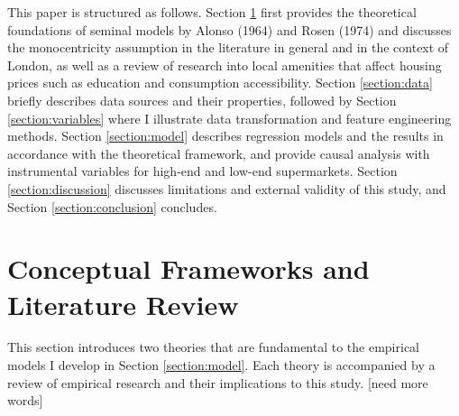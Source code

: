 \documentclass{article}
\begin{document}
This paper is structured as follows. Section \ref{section:lit} first provides the theoretical foundations of seminal models by Alonso (1964) and Rosen (1974) and discusses the monocentricity assumption in the literature in general and in the context of London, as well as a review of research into local amenities that affect housing prices such as education and consumption accessibility. Section \ref{section:data} briefly describes data sources and their properties, followed by Section \ref{section:variables} where I illustrate data transformation and feature engineering methods. Section \ref{section:model} describes regression models and the results in accordance with the theoretical framework, and provide causal analysis with instrumental variables for high-end and low-end supermarkets. Section \ref{section:discussion} discusses limitations and external validity of this study, and Section \ref{section:conclusion} concludes.


\section{Conceptual Frameworks and Literature Review} \label{section:lit}
This section introduces two theories that are fundamental to the empirical models I develop in Section \ref{section:model}. Each theory is accompanied by a review of empirical research and their implications to this study. [need more words]
\end{document}
